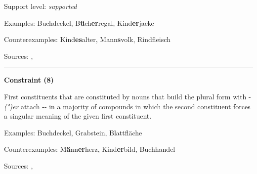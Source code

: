 \vspace{-1.35em}

\noindent
Support level: \textit{supported}

\vspace{0.3em}

\noindent
Examples: Buch{\zeroLinker}deckel, B\textbf{ü}ch\textbf{er}regal, Kind\textbf{er}jacke

\noindent
Counterexamples: Kind\textbf{es}alter, Mann\textbf{s}volk, Rind{\zeroLinker}fleisch

\vspace{0.3em}

\noindent
Sources: \citet[229]{eisenberg_2013}, \citet[99]{ortner_mueller-bollhagen_1991}


\hrule




\vspace{0.4em}

\begin{center}
\textbf{Constraint (8)}
\end{center}

\noindent
First constituents that are constituted by nouns that build the plural form with -\textit{(")er} attach \mbox{-{\zeroLinker}-} in a \underline{majority} of compounds in which the second constituent forces a singular meaning of the given first constituent.
\vspace{0.35em}


\vspace{0.3em}

\noindent
Examples: Buch{\zeroLinker}deckel, Grab{\zeroLinker}stein, Blatt{\zeroLinker}fläche

\noindent
Counterexamples: M\textbf{ä}nn\textbf{er}herz, Kind\textbf{er}bild, Buch{\zeroLinker}handel

\vspace{0.3em}

\noindent
Sources: \citet[229]{eisenberg_2013}, \citet[99, 108]{ortner_mueller-bollhagen_1991}


